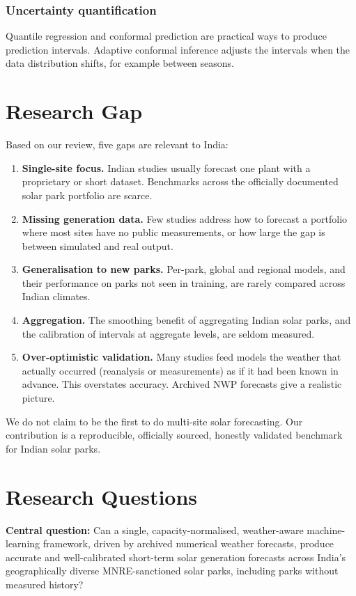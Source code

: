\documentclass[12pt]{report}
\begin{document}
\subsubsection{Uncertainty quantification}
Quantile regression \cite{koenker1978} and conformal prediction \cite{romano2019} are practical ways to produce prediction intervals. Adaptive conformal inference \cite{gibbs2021} adjusts the intervals when the data distribution shifts, for example between seasons.

\section{Research Gap}
\vspace{1mm}
Based on our review, five gaps are relevant to India:
\begin{enumerate}[noitemsep]
    \item \textbf{Single-site focus.} Indian studies usually forecast one plant with a proprietary or short dataset. Benchmarks across the officially documented solar park portfolio are scarce.
    \item \textbf{Missing generation data.} Few studies address how to forecast a portfolio where most sites have no public measurements, or how large the gap is between simulated and real output.
    \item \textbf{Generalisation to new parks.} Per-park, global and regional models, and their performance on parks not seen in training, are rarely compared across Indian climates.
    \item \textbf{Aggregation.} The smoothing benefit of aggregating Indian solar parks, and the calibration of intervals at aggregate levels, are seldom measured.
    \item \textbf{Over-optimistic validation.} Many studies feed models the weather that actually occurred (reanalysis or measurements) as if it had been known in advance. This overstates accuracy. Archived NWP forecasts give a realistic picture.
\end{enumerate}
We do not claim to be the first to do multi-site solar forecasting. Our contribution is a reproducible, officially sourced, honestly validated benchmark for Indian solar parks.

\section{Research Questions}
\vspace{1mm}
\textbf{Central question:} Can a single, capacity-normalised, weather-aware machine-learning framework, driven by archived numerical weather forecasts, produce accurate and well-calibrated short-term solar generation forecasts across India's geographically diverse MNRE-sanctioned solar parks, including parks without measured history?
\end{document}

